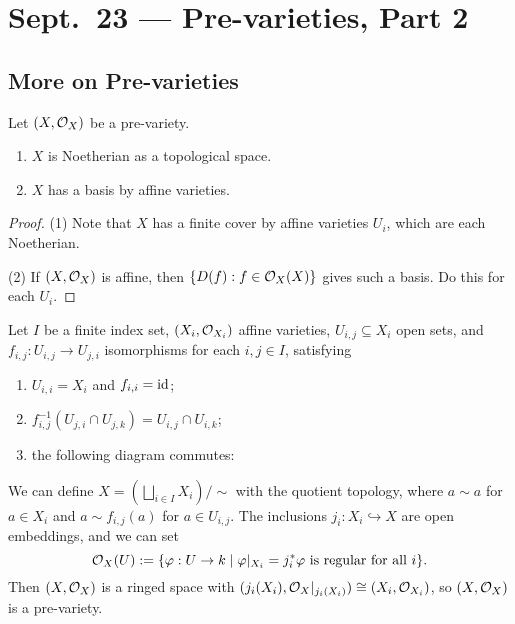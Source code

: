 \chapter{Sept.~23 --- Pre-varieties, Part 2}

\section{More on Pre-varieties}

\begin{prop}
  Let $(X, \mathcal{O}_X)$ be a pre-variety.
  \begin{enumerate}
    \item $X$ is Noetherian as a
      topological space.
    \item $X$ has a basis by affine varieties.
  \end{enumerate}
\end{prop}

\begin{proof}
  (1) Note that
  $X$ has a finite cover by
  affine varieties $U_i$, which are
  each Noetherian.

  (2) If $(X, \mathcal{O}_X)$ is affine, then
  $\{D(f) : f \in \mathcal{O}_X(X)\}$ gives such
  a basis. Do this for each
  $U_i$.
\end{proof}

\begin{example}
  Let $I$ be a finite index set,
  $(X_i, \mathcal{O}_{X_i})$ affine varieties,
  $U_{i, j} \subseteq X_i$ open sets, and
  $f_{i, j} : U_{i, j} \to U_{j, i}$
  isomorphisms
  for each $i, j \in I$, satisfying
  \begin{enumerate}
    \item $U_{i, i} = X_i$ and
      $f_{i, i} = \operatorname{id}$;
    \item $f_{i, j}^{-1}(U_{j, i} \cap U_{j, k}) = U_{i, j} \cap U_{i, k}$;
    \item the following diagram commutes:
      \begin{center}
      \end{center}
  \end{enumerate}
  We can define
  $X = (\bigsqcup_{i \in I} X_i) / {\sim}$
  with the quotient topology, where
  $a \sim a$ for $a \in X_i$ and
  $a \sim f_{i, j}(a)$ for $a \in U_{i, j}$.
  The inclusions $j_i : X_i \hookrightarrow X$
  are open embeddings, and we can set
  \[
    \mathcal{O}_X(U)
    := \{
      \varphi : U \to k \mid
      \varphi|_{X_i} = j_i^* \varphi
      \text{ is regular for all } i
    \}.
  \]
  Then $(X, \mathcal{O}_X)$ is a ringed space
  with $(j_i(X_i), \mathcal{O}_X|_{j_i(X_i)}) \cong (X_i, \mathcal{O}_{X_i})$,
  so $(X, \mathcal{O}_X)$ is a pre-variety.
\end{example}

